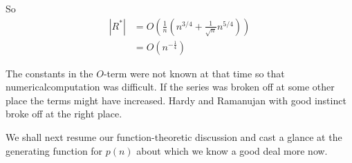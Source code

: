 So
\begin{align*}
  |R^*| & = O  \left( \frac{1}{n} \left( n^{3/4} +
  \frac{1}{\sqrt{n}} n^{5/4}\right)\right)\\
  & = O  \left(n^{-\frac{1}{4}} \right)
\end{align*}

The constants in the $O$-term were not known at that time so
that numerical\pageoriginale computation was difficult. If the series
was broken off at some other place the terms might have
increased. Hardy and Ramanujan with good instinct broke off at the
right place.

We shall next resume our function-theoretic discussion and cast a
glance at the generating function for $p(n)$ about which we know a
good deal more now. 
 

